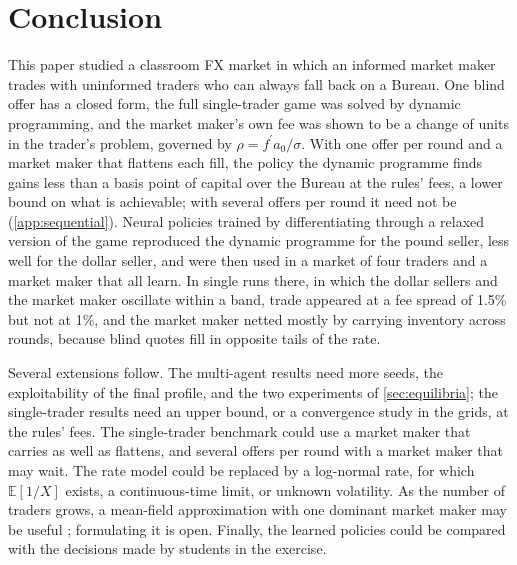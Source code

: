 \documentclass[11pt,a4paper]{article}
\theoremstyle{plain}
\theoremstyle{definition}
\newcommand{\E}{\mathbb{E}}
\newcommand{\1}{\mathbf{1}}
\newcommand{\fp}{f^{\prime}}
\begin{document}
\section{Conclusion}\label{sec:conclusion}
This paper studied a classroom FX market in which an informed market maker trades with uninformed traders who can always fall back on a Bureau. One blind offer has a closed form, the full single-trader game was solved by dynamic programming, and the market maker's own fee was shown to be a change of units in the trader's problem, governed by $\rho=\fp a_0/\sigma$. With one offer per round and a market maker that flattens each fill, the policy the dynamic programme finds gains less than a basis point of capital over the Bureau at the rules' fees, a lower bound on what is achievable; with several offers per round it need not be (\cref{app:sequential}). Neural policies trained by differentiating through a relaxed version of the game reproduced the dynamic programme for the pound seller, less well for the dollar seller, and were then used in a market of four traders and a market maker that all learn. In single runs there, in which the dollar sellers and the market maker oscillate within a band, trade appeared at a fee spread of 1.5\% but not at 1\%, and the market maker netted mostly by carrying inventory across rounds, because blind quotes fill in opposite tails of the rate.

Several extensions follow. The multi-agent results need more seeds, the exploitability of the final profile, and the two experiments of \cref{sec:equilibria}; the single-trader results need an upper bound, or a convergence study in the grids, at the rules' fees. The single-trader benchmark could use a market maker that carries as well as flattens, and several offers per round with a market maker that may wait. The rate model could be replaced by a log-normal rate, for which $\E[1/X]$ exists, a continuous-time limit, or unknown volatility. As the number of traders grows, a mean-field approximation with one dominant market maker may be useful \citep{carmona2018}; formulating it is open. Finally, the learned policies could be compared with the decisions made by students in the exercise.


\renewcommand{\bibfont}{\small}
\setlength{\bibsep}{1.5pt plus 0.5pt}


\end{document}
